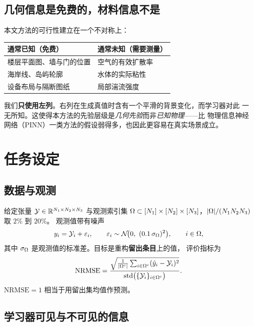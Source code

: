 \documentclass[11pt,a4paper]{article}
\begin{document}
\subsection{几何信息是免费的，材料信息不是}

本文方法的可行性建立在一个不对称上：

\begin{center}
\begin{tabular}{@{}ll@{}}
\toprule
\textbf{通常已知（免费）} & \textbf{通常未知（需要测量）}\\
\midrule
楼层平面图、墙与门的位置 & 空气的有效扩散率\\
海岸线、岛屿轮廓 & 水体的实际粘性\\
设备布局与隔断图纸 & 局部湍流强度\\
\bottomrule
\end{tabular}
\end{center}

我们\textbf{只使用左列}。右列在生成真值时含有一个平滑的背景变化，而学习器对此
一无所知。这使得本方法的先验层级是\emph{几何先验}而非\emph{已知物理}——比
物理信息神经网络（PINN）一类方法的假设弱得多，也因此更容易在真实场景成立。

\section{任务设定}

\subsection{数据与观测}

给定张量 $\mathcal{Y}\in\mathbb{R}^{N_1\times N_2\times N_3}$ 与观测索引集 $\Omega\subset
[N_1]\times[N_2]\times[N_3]$，$|\Omega|/(N_1N_2N_3)$ 取 $2\%$ 到 $20\%$。
观测值带有噪声
\begin{equation}
y_{i}=\mathcal{Y}_{i}+\varepsilon_i,\qquad
\varepsilon_i\sim\mathcal N\!\big(0,\ (0.1\,\sigma_{\Omega})^2\big),\qquad
i\in\Omega,
\end{equation}
其中 $\sigma_\Omega$ 是观测值的标准差。目标是重构\textbf{留出条目}上的值，
评价指标为
\begin{equation}
\mathrm{NRMSE}=\frac{\sqrt{\frac{1}{|\Omega^c|}\sum_{i\in\Omega^c}(\hat y_i-\mathcal{Y}_i)^2}}
{\mathrm{std}\big(\{\mathcal{Y}_i\}_{i\in\Omega^c}\big)}.
\end{equation}
$\mathrm{NRMSE}=1$ 相当于用留出集均值作预测。

\subsection{学习器可见与不可见的信息}
\end{document}
